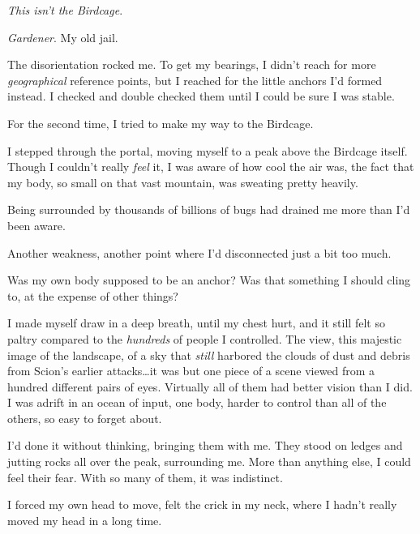 \emph{This isn't the Birdcage}.



\emph{Gardener}.  My old jail.



The disorientation rocked me.  To get my bearings, I didn't reach for more \emph{geographical} reference points, but I reached for the little anchors I'd formed instead.  I checked and double checked them until I could be sure I was stable.



For the second time, I tried to make my way to the Birdcage.



I stepped through the portal, moving myself to a peak above the Birdcage itself.  Though I couldn't really \emph{feel} it, I was aware of how cool the air was, the fact that my body, so small on that vast mountain, was sweating pretty heavily.



Being surrounded by thousands of billions of bugs had drained me more than I'd been aware.



Another weakness, another point where I'd disconnected just a bit too much.



Was my own body supposed to be an anchor?  Was that something I should cling to, at the expense of other things?



I made myself draw in a deep breath, until my chest hurt, and it still felt so paltry compared to the \emph{hundreds} of people I controlled.  The view, this majestic image of the landscape, of a sky that \emph{still} harbored the clouds of dust and debris from Scion's earlier attacks\ldots it was but one piece of a scene viewed from a hundred different pairs of eyes.  Virtually all of them had better vision than I did.  I was adrift in an ocean of input, one body, harder to control than all of the others, so easy to forget about.



I'd done it without thinking, bringing them with me.  They stood on ledges and jutting rocks all over the peak, surrounding me.  More than anything else, I could feel their fear.  With so many of them, it was indistinct.



I forced my own head to move, felt the crick in my neck, where I hadn't really moved my head in a long time.



